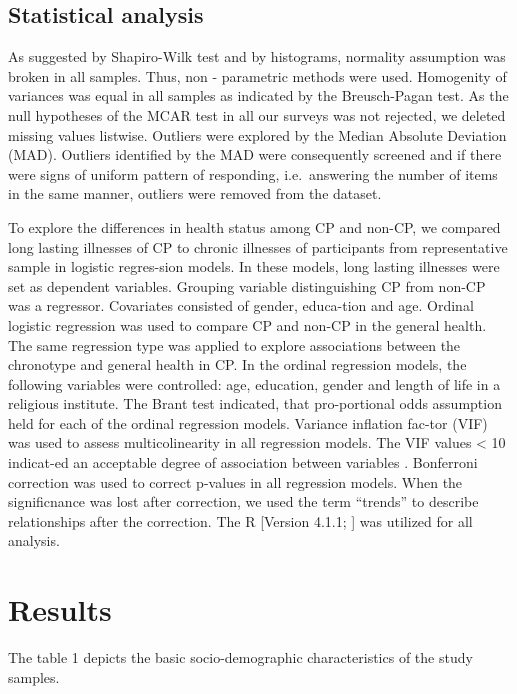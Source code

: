 \documentclass[ijerph,article,accept,moreauthors,pdftex]{mdpi}
\begin{document}
\hypertarget{statistical-analysis}{%
\subsection{Statistical analysis}\label{statistical-analysis}}

As suggested by Shapiro-Wilk test and by histograms, normality
assumption was broken in all samples. Thus, non - parametric methods
were used. Homogenity of variances was equal in all samples as indicated
by the Breusch-Pagan test. As the null hypotheses of the MCAR test in
all our surveys was not rejected, we deleted missing values listwise.
Outliers were explored by the Median Absolute Deviation (MAD). Outliers
identified by the MAD were consequently screened and if there were signs
of uniform pattern of responding, i.e.~answering the number of items in
the same manner, outliers were removed from the dataset.

To explore the differences in health status among CP and non-CP, we
compared long lasting illnesses of CP to chronic illnesses of
participants from representative sample in logistic regres-sion models.
In these models, long lasting illnesses were set as dependent variables.
Grouping variable distinguishing CP from non-CP was a regressor.
Covariates consisted of gender, educa-tion and age. Ordinal logistic
regression was used to compare CP and non-CP in the general health. The
same regression type was applied to explore associations between the
chronotype and general health in CP. In the ordinal regression models,
the following variables were controlled: age, education, gender and
length of life in a religious institute. The Brant test indicated, that
pro-portional odds assumption held for each of the ordinal regression
models. Variance inflation fac-tor (VIF) was used to assess
multicolinearity in all regression models. The VIF values \textless{} 10
indicat-ed an acceptable degree of association between variables
\citep{TAY2017}. Bonferroni correction was used to correct p-values in
all regression models. When the significnance was lost after correction,
we used the term ``trends'' to describe relationships after the
correction. The R {[}Version 4.1.1; \citet{R-base}{]} was utilized for
all analysis.

\hypertarget{results}{%
\section{Results}\label{results}}

The table 1 depicts the basic socio-demographic characteristics of the
study samples.
\end{document}
